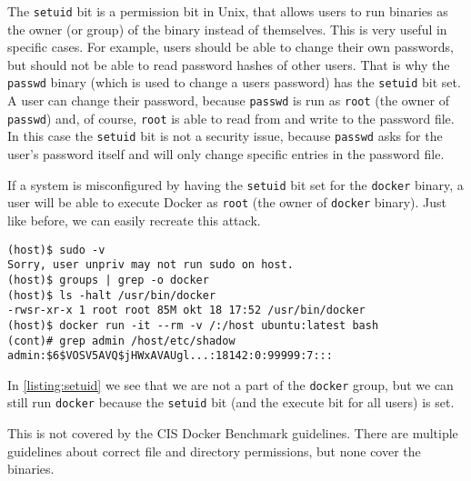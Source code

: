 \medskip

The \lstinline{setuid} bit is a permission bit in Unix, that allows users to run binaries as the owner (or group) of the binary instead of themselves.
This is very useful in specific cases. For example, users should be able to change their own passwords, but should not be able to read password hashes of other users. That is why the \lstinline{passwd} binary (which is used to change a users password) has the \lstinline{setuid} bit set. A user can change their password, because \lstinline{passwd} is run as \lstinline{root} (the owner of \lstinline{passwd}) and, of course, \lstinline{root} is able to read from and write to the password file. In this case the \lstinline{setuid} bit is not a security issue, because \lstinline{passwd} asks for the user's password itself and will only change specific entries in the password file.

\medskip

If a system is misconfigured by having the \lstinline{setuid} bit set for the \lstinline{docker} binary, a user will be able to execute Docker as \lstinline{root} (the owner of \lstinline{docker} binary). Just like before, we can easily recreate this attack.

\begin{lstlisting}[caption={Docker \lstinline{setuid} exploit example.},captionpos=b, label={listing:setuid}]
(host)$ sudo -v
Sorry, user unpriv may not run sudo on host.
(host)$ groups | grep -o docker
(host)$ ls -halt /usr/bin/docker
-rwsr-xr-x 1 root root 85M okt 18 17:52 /usr/bin/docker
(host)$ docker run -it --rm -v /:/host ubuntu:latest bash
(cont)# grep admin /host/etc/shadow
admin:$6$VOSV5AVQ$jHWxAVAUgl...:18142:0:99999:7:::
\end{lstlisting}

In \autoref{listing:setuid} we see that we are not a part of the \lstinline{docker} group, but we can still run \lstinline{docker} because the \lstinline{setuid} bit (and the execute bit for all users) is set.

\medskip

This is not covered by the CIS Docker Benchmark guidelines. There are multiple guidelines about correct file and directory permissions, but none cover the binaries.
